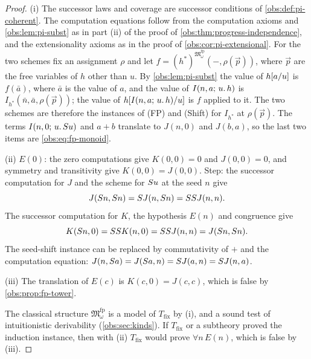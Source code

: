 \begin{proof}
(i) The successor laws and coverage are successor conditions of
\cref{obs:def:pi-coherent}. The computation equations follow from the
computation axioms and \cref{obs:lem:pi-subst} as in part (ii) of the proof of
\cref{obs:thm:progress-independence}, and the extensionality axioms as in the
proof of \cref{obs:cor:pi-extensional}. For the two schemes fix an assignment
$\rho$ and let $f=(h^{*})^{\mathfrak{M}^{\mathrm{fp}}_\omega}(-,\rho(\vec p))$,
where $\vec p$ are the free variables of $h$ other than $u$. By
\cref{obs:lem:pi-subst} the value of $h[a/u]$ is $f(\bar a)$, where
$\bar a$ is the value of $a$, and the value of $I(n,a;\,u.\,h)$ is
$I_{h^{*}}(\bar n,\bar a,\rho(\vec p))$; the value of
$h[I(n,a;\,u.\,h)/u]$ is $f$ applied to it. The two schemes are
therefore the instances of (FP) and (Shift) for $I_{h^{*}}$ at
$\rho(\vec p)$. The terms $I(n,0;\,u.\,S u)$ and $a+b$ translate to
$J(n,0)$ and $J(b,a)$, so the last two items are \eqref{obs:eq:fp-monoid}.

(ii) $E(0)$: the zero computations give $K(0,0)=0$ and $J(0,0)=0$, and
symmetry and transitivity give $K(0,0)=J(0,0)$. Step: the successor
computation for $J$ and the scheme for $S u$ at the seed $n$ give
\[
J(S n,S n)=S J(n,S n)=SS J(n,n).
\]
The successor computation for $K$, the hypothesis $E(n)$ and congruence give
\[
K(S n,0)=SS K(n,0)=SS J(n,n)=J(S n,S n).
\]
The seed-shift instance can be replaced by commutativity of $+$ and the
computation equation:
$J(n,S a)=J(S a,n)=S J(a,n)=S J(n,a)$.

(iii) The translation of $E(c)$ is $K(c,0)=J(c,c)$, which is false by
\cref{obs:prop:fp-tower}.

The classical structure $\mathfrak{M}^{\mathrm{fp}}_\omega$ is a model of
$T_{\mathrm{fix}}$ by (i), and a sound test of intuitionistic derivability
(\cref{obs:sec:kinds}). If $T_{\mathrm{fix}}$ or a subtheory proved the
induction instance, then with (ii) $T_{\mathrm{fix}}$ would prove
$\forall n\,E(n)$, which is false by (iii).
\end{proof}

